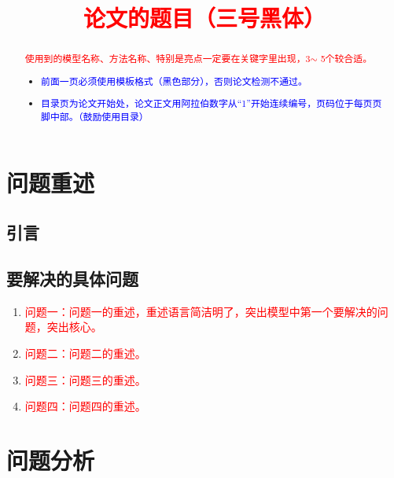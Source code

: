 \documentclass[a4paper]{nmmcm}
\title{\textcolor{red}{论文的题目（三号黑体）}}
\date{}
\begin{document}
\begin{abstract}


\begin{keywords}
{\song\xiaosihao
\textcolor{red}{使用到的模型名称、方法名称、特别是亮点一定要在关键字里出现，3$\sim$ 5个较合适。}}
\end{keywords}

\begin{itemize}
  \item \textcolor{blue}{前面一页必须使用模板格式（黑色部分），否则论文检测不通过。}
  \item \textcolor{blue}{ 目录页为论文开始处，论文正文用阿拉伯数字从“1”开始连续编号，页码位于每页页脚中部。（鼓励使用目录）}
\end{itemize}

\end{abstract}
\maketitle 
\tableofcontents

\newpage
\setcounter{page}{1}
\pagestyle{fancy}

\section{问题重述}
\subsection{引言}


\subsection{要解决的具体问题}
\begin{enumerate}
  \item \textcolor{red}{问题一：问题一的重述，重述语言简洁明了，突出模型中第一个要解决的问题，突出核心。}
  \item \textcolor{red}{问题二：问题二的重述。}
  \item \textcolor{red}{问题三：问题三的重述。}
  \item \textcolor{red}{问题四：问题四的重述。}
\end{enumerate}







\section{问题分析}
\end{document}
